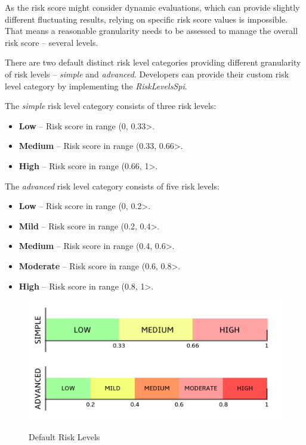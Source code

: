 As the risk score might consider dynamic evaluations, which can provide slightly different fluctuating results, relying on specific risk score values is impossible.
That means a reasonable granularity needs to be assessed to manage the overall risk score -- several levels.

There are two default distinct risk level categories providing different granularity of risk levels -- \textit{simple} and \textit{advanced}.
Developers can provide their custom risk level category by implementing the \textit{RiskLevelsSpi}.

\newpage

The \textit{simple} risk level category consists of three risk levels:
\begin{itemize}
    \item \textbf{Low} -- Risk score in range (0, 0.33>.
    \item \textbf{Medium} -- Risk score in range (0.33, 0.66>.
    \item \textbf{High} -- Risk score in range (0.66, 1>.
\end{itemize}

The \textit{advanced} risk level category consists of five risk levels:
\begin{itemize}
    \item \textbf{Low} -- Risk score in range (0, 0.2>.
    \item \textbf{Mild} -- Risk score in range (0.2, 0.4>.
    \item \textbf{Medium} -- Risk score in range (0.4, 0.6>.
    \item \textbf{Moderate} -- Risk score in range (0.6, 0.8>.
    \item \textbf{High} -- Risk score in range (0.8, 1>.
\end{itemize}

\begin{figure}[htbp]
  \centering
  \includegraphics[width=1\textwidth]{img/sections/5-design/risk-levels.png}
  \label{fig:risk-levels}
  \caption{Default Risk Levels}
\end{figure}

